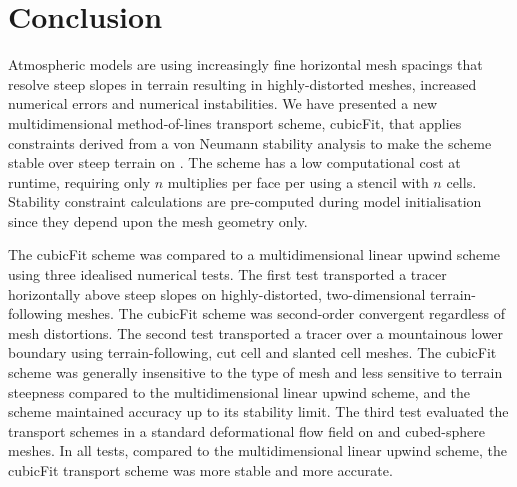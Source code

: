\section{Conclusion}
\label{sec:conclusion}

Atmospheric models are using increasingly fine horizontal mesh spacings that resolve steep slopes in terrain resulting in highly-distorted meshes, increased numerical errors and numerical instabilities.
We have presented a new multidimensional method-of-lines transport scheme, cubicFit, that applies constraints derived from a von Neumann stability analysis to make the scheme stable over steep terrain on .
The scheme has a low computational cost at runtime, requiring only $n$ multiplies per face per  using a stencil with $n$ cells.  Stability constraint calculations are pre-computed during model initialisation since they depend upon the mesh geometry only.

The cubicFit scheme was compared to a multidimensional linear upwind scheme using three idealised numerical tests.
The first test transported a tracer horizontally above steep slopes on highly-distorted, two-dimensional terrain-following meshes.  The cubicFit scheme was second-order convergent regardless of mesh distortions.
The second test transported a tracer over a mountainous lower boundary using terrain-following, cut cell and slanted cell meshes.
The cubicFit scheme was generally insensitive to the type of mesh and less sensitive to terrain steepness compared to the multidimensional linear upwind scheme, and the scheme maintained accuracy up to its stability limit.
The third test evaluated the transport schemes in a standard deformational flow field on  and cubed-sphere meshes.
In all tests, compared to the multidimensional linear upwind scheme, the cubicFit transport scheme was more stable and more accurate.

